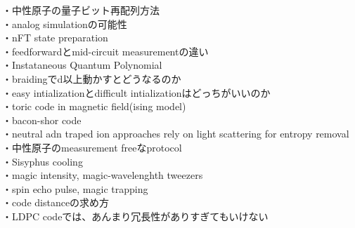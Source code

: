 \documentclass[a4paper,10.5pt]{ltjsarticle}
\begin{document}
・中性原子の量子ビット再配列方法\\
・analog simulationの可能性\\
・nFT state preparation\\
・feedforwardとmid-circuit measurementの違い\\
・Instataneous Quantum Polynomial\\
・braidingでd以上動かすとどうなるのか\\
・easy intializationとdifficult intializationはどっちがいいのか\\
・toric code in magnetic field(ising model)\\
・bacon-shor code\\
・neutral adn traped ion approaches rely on light scattering for entropy removal\\
・中性原子のmeasurement freeなprotocol\\
・Sisyphus cooling\\
・magic intensity, magic-wavelenghth tweezers\\
・spin echo pulse, magic trapping\\
・code distanceの求め方\\
・LDPC codeでは、あんまり冗長性がありすぎてもいけない\\
\end{document}
